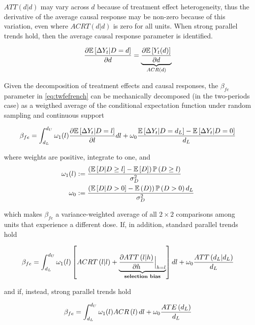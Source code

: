 \documentclass[11pt]{article}
\begin{document}
$ATT(d|d)$ may vary across $d$ because of treatment effect heterogeneity, thus the derivative of the average causal response may be non-zero because of this variation, even where $ACRT(d|d)$ is zero for all units. When strong parallel trends hold, then the average causal response parameter is identified. 

\begin{equation}
    \frac{\partial \mathbb{E}\left[ \Delta Y_{t} | D = d \right]}{\partial d} = \underbrace{\frac{\partial \mathbb{E}\left[ Y_{t}(d) \right]}{\partial d}}_{ACR(d)}
\end{equation}

Given the decomposition of treatment effects and causal responses, the $\beta_{fe}$ parameter in \eqref{eq:twfefrench} can be mechanically decomposed (in the two-periods case) as a weigthed average of the conditional expectation function under random sampling and continuous support

\begin{equation}
    \beta_{fe} = \int_{d_L}^{d_U} \omega_1 (l) \frac{\partial \mathbb{E}\left[ \Delta Y_{t} | D = l \right]}{\partial l}dl + \omega_0 \frac{\mathbb{E}\left[ \Delta Y_{t} | D = d_L \right] - \mathbb{E}\left[ \Delta Y_{t} | D = 0 \right]}{d_L}\label{eq:decomp-noass}
\end{equation}

where weights are positive, integrate to one, and
\begin{equation}
    \begin{split}
        \omega_1(l) &:= \frac{\left( \mathbb{E}\left[ D|D \geq l \right] - \mathbb{E}\left[ D \right] \right)\mathbb{P}\left( D \geq l \right)}{\sigma^2_D}\\
        \omega_0 &:= \frac{\left( \mathbb{E}\left[ D|D > 0 \right] - \mathbb{E}\left( D \right) \right)\mathbb{P}\left( D > 0 \right)d_L}{\sigma^2_D}\label{eq:callawayweights}
    \end{split}
\end{equation}

which makes $\beta_{fe}$ a variance-weighted average of all $2\times2$ comparisons among units that experience a different dose. If, in addition, standard parallel trends hold

\begin{equation}
    \beta_{fe} = \int_{d_L}^{d_U} \omega_1 (l) \left[ ACRT\left( l|l \right) + \underbrace{\frac{\partial ATT\left( l|h \right)}{\partial h}\Big\vert_{h=l}}_{\text{\textbf{selection bias}}} \right]dl + \omega_0 \frac{ATT\left( d_L|d_L \right)}{d_L}\label{eq:decomp-ptrends}
\end{equation}

and if, instead, strong parallel trends hold

\begin{equation}
    \beta_{fe} = \int_{d_L}^{d_U} \omega_1 (l) ACR\left( l \right)dl + \omega_0 \frac{ATE\left( d_L \right)}{d_L}\label{eq:decomp-ptrends}
\end{equation}
\end{document}
